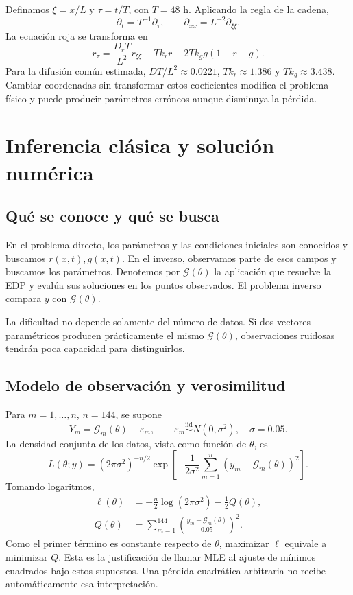 \documentclass[11pt,a4paper]{report}
\begin{document}
Definamos $\xi=x/L$ y $\tau=t/T$, con $T=48$ h. Aplicando la regla de la cadena,
\[
\partial_t=T^{-1}\partial_\tau,\qquad
\partial_{xx}=L^{-2}\partial_{\xi\xi}.
\]
La ecuación roja se transforma en
\begin{equation}
r_\tau=\frac{D_rT}{L^2}r_{\xi\xi}-Tk_rr+2Tk_gg(1-r-g).
\end{equation}
Para la difusión común estimada, $DT/L^2\approx0.0221$, $Tk_r\approx1.386$ y $Tk_g\approx3.438$. Cambiar coordenadas sin transformar estos coeficientes modifica el problema físico y puede producir parámetros erróneos aunque disminuya la pérdida.



\chapter{Inferencia clásica y solución numérica}
\section{Qué se conoce y qué se busca}
En el problema directo, los parámetros y las condiciones iniciales son conocidos y buscamos $r(x,t),g(x,t)$. En el inverso, observamos parte de esos campos y buscamos los parámetros. Denotemos por $\mathcal G(\theta)$ la aplicación que resuelve la EDP y evalúa sus soluciones en los puntos observados. El problema inverso compara $y$ con $\mathcal G(\theta)$.

La dificultad no depende solamente del número de datos. Si dos vectores paramétricos producen prácticamente el mismo $\mathcal G(\theta)$, observaciones ruidosas tendrán poca capacidad para distinguirlos.

\section{Modelo de observación y verosimilitud}
Para $m=1,\ldots,n$, $n=144$, se supone
\begin{equation}
Y_m=\mathcal G_m(\theta)+\varepsilon_m,\qquad
\varepsilon_m\overset{\mathrm{iid}}\sim N(0,\sigma^2),\quad \sigma=0.05.
\end{equation}
La densidad conjunta de los datos, vista como función de $\theta$, es
\[
L(\theta;y)=(2\pi\sigma^2)^{-n/2}
\exp\left[-\frac{1}{2\sigma^2}\sum_{m=1}^n(y_m-\mathcal G_m(\theta))^2\right].
\]
Tomando logaritmos,
\begin{align}
\ell(\theta)&=-\frac n2\log(2\pi\sigma^2)-\frac12Q(\theta),\\
Q(\theta)&=\sum_{m=1}^{144}\left(\frac{y_m-\mathcal G_m(\theta)}{0.05}\right)^2.
\end{align}
Como el primer término es constante respecto de $\theta$, maximizar $\ell$ equivale a minimizar $Q$. Esta es la justificación de llamar MLE al ajuste de mínimos cuadrados bajo estos supuestos. Una pérdida cuadrática arbitraria no recibe automáticamente esa interpretación.
\end{document}
